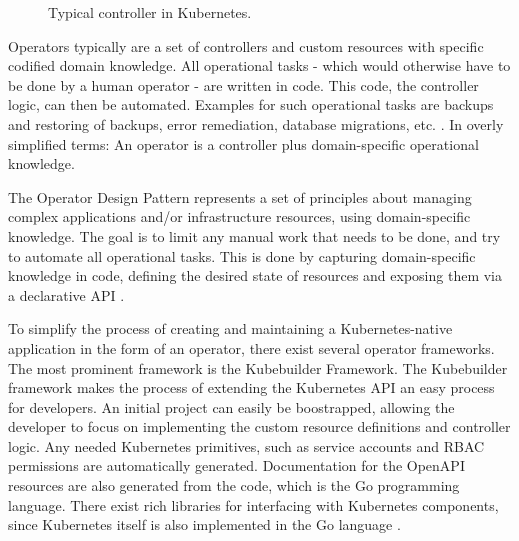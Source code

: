 \begin{figure}[h]
	\centering
	\caption{Typical controller in Kubernetes.
	}
	\label{fig:typicalControllerKubernetes}	
\end{figure}

Operators typically are a set of controllers and custom resources
with specific codified domain knowledge.
All operational tasks -
which would otherwise have to be done by a human operator -
are written in code.
This code, the controller logic, can then be automated.
Examples for such operational tasks are
backups and restoring of backups, error remediation, database migrations, etc.
\autocite{operatorWhitepaperV1}.
In overly simplified terms:
An operator is a controller plus domain-specific operational knowledge.
\autocite{operatorWhitepaperV1}


The Operator Design Pattern represents a set of principles about
managing complex applications and/or infrastructure resources,
using domain-specific knowledge.
The goal is to limit any manual work that needs to be done,
and try to automate all operational tasks.
This is done by capturing domain-specific knowledge in code,
defining the desired state of resources and exposing them
via a declarative API
\autocite{operatorWhitepaperV1}.

To simplify the process of creating and maintaining a Kubernetes-native application
in the form of an operator,
there exist several operator frameworks.
The most prominent framework is the Kubebuilder Framework.
The Kubebuilder framework makes the process of extending the Kubernetes API
an easy process for developers.
An initial project can easily be boostrapped, allowing the developer to focus
on implementing the custom resource definitions and controller logic.
Any needed Kubernetes primitives, such as service accounts and RBAC permissions
are automatically generated.
Documentation for the OpenAPI resources are also generated from the code,
which is the Go programming language.
There exist rich libraries for interfacing with Kubernetes components,
since Kubernetes itself is also implemented in the Go language
\autocite{kubebuilderBookWebsite}.

